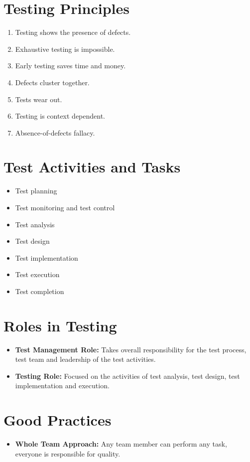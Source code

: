 \documentclass{article}
\begin{document}
\begin{multicols}{3}
{\section*{Testing Principles}
\begin{enumerate}
  \item Testing shows the presence of defects. 
  \item Exhaustive testing is impossible. 
  \item Early testing saves time and money. 
  \item Defects cluster together.
  \item Tests wear out.
  \item Testing is context dependent. 
  \item Absence-of-defects fallacy.
\end{enumerate}

\section*{Test Activities and Tasks}
\begin{itemize}
  \item Test planning
  \item Test monitoring and test control
  \item Test analysis
  \item Test design
  \item Test implementation
  \item Test execution
  \item Test completion
\end{itemize}

\section*{Roles in Testing}
\begin{itemize}
  \item \textbf{Test Management Role:} Takes overall responsibility for the test process, test team and leadership of the test activities.
  \item \textbf{Testing Role:} Focused on the activities of test analysis, test design, test implementation and execution.
\end{itemize}

\section*{Good Practices}
\begin{itemize}
    \item \textbf{Whole Team Approach:}
    Any team member can perform any task, everyone is responsible for quality.
    

\end{itemize}}
\end{multicols}
\end{document}
